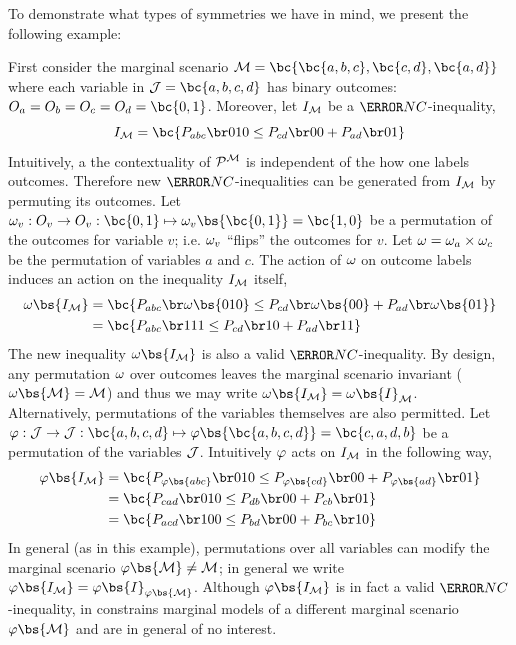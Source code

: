 \documentclass[aps, 10pt, english, twoside, pra, nofootinbib, longbibliography]{revtex4-1}
\begin{document}
    To demonstrate what types of symmetries we have in mind, we present the following example:
    \begin{example}
        \label{ex:symmetries}
        First consider the marginal scenario $\mscenario = \bc{\bc{a, b, c}, \bc{c, d}, \bc{a, d}}$ where each variable in $\jointvar = \bc{a,b,c,d}$ has binary outcomes: $O_a = O_b = O_c = O_d = \bc{0,1}$. Moreover, let $I_{\mathcal{M}}$ be a $\s{NC}$-inequality,
        \[ I_{\mscenario} = \bc{\prob[abc][010] \leq \prob[cd][00] + \prob[ad][01]}  \]
        Intuitively, a the contextuality of $\probvec^{\mscenario}$ is independent of the how one labels outcomes. Therefore new $\s{NC}$-inequalities can be generated from $I_{\mathcal{M}}$ by permuting its outcomes. Let $\geo_v : O_v \to O_v : \bc{0,1} \mapsto \geo_v\bs{\bc{0,1}} = \bc{1,0}$ be a permutation of the outcomes for variable $v$; i.e. $\omega_v$ ``flips'' the outcomes for $v$. Let $\omega = \omega_a \times \omega_c$ be the permutation of variables $a$ and $c$. The action of $\omega$ on outcome labels induces an action on the inequality $I_{\mathcal{M}}$ itself,
        \begin{align*}
        \geo\bs{I_{\mscenario}} &= \bc{\prob[abc][\geo\bs{010}] \leq \prob[cd][\geo\bs{00}] + \prob[ad][\geo\bs{01}]} \\
        &= \bc{\prob[abc][111] \leq \prob[cd][10] + \prob[ad][11]}
        \end{align*}
        The new inequality $\geo\bs{I_{\mscenario}}$ is also a valid $\s{NC}$-inequality. By design, any permutation $\omega$ over outcomes leaves the marginal scenario invariant ($\geo\bs{\mscenario} = \mscenario$) and thus we may write $\geo\bs{I_{\mscenario}} = \geo\bs{I}_{\mscenario}$. \\

        Alternatively, permutations of the variables themselves are also permitted. Let $\gep : \jointvar \to \jointvar : \bc{a,b,c,d} \mapsto \gep\bs{\bc{a,b,c,d}} = \bc{c,a,d,b}$ be a permutation of the variables $\mathcal{J}$. Intuitively $\varphi$ acts on $I_{\mathcal{M}}$ in the following way,
        \begin{align*}
        \gep\bs{I_{\mscenario}} &= \bc{\prob[\gep\bs{abc}][010] \leq \prob[\gep\bs{cd}][00] + \prob[\gep\bs{ad}][01]} \\
        &= \bc{\prob[cad][010] \leq \prob[db][00] + \prob[cb][01]} \\
        &= \bc{\prob[acd][100] \leq \prob[bd][00] + \prob[bc][10]}
        \end{align*}
        In general (as in this example), permutations over all variables can modify the marginal scenario $\gep\bs{\mscenario} \neq \mscenario$; in general we write $\gep\bs{I_{\mscenario}} = \gep\bs{I}_{\gep\bs{\mscenario}}$. Although $\gep\bs{I_{\mscenario}}$ is in fact a valid $\s{NC}$-inequality, in constrains marginal models of a different marginal scenario $\gep\bs{\mscenario}$ and are in general of no interest.
    \end{example}
\end{document}
